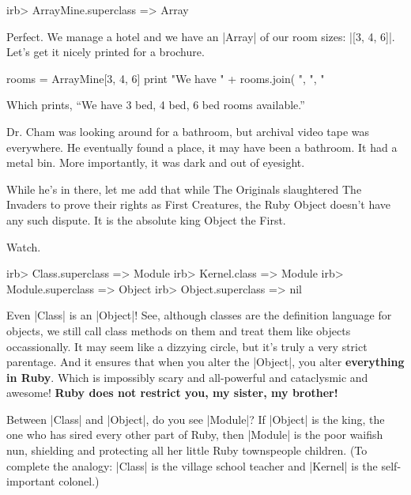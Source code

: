 \documentclass[12pt,twoside]{report}
\begin{document}
\begin{consolecode}

 irb> ArrayMine.superclass
   => Array

\end{consolecode}


Perfect.  We manage a hotel and we have an
\rubyinline|Array| of our room sizes:
\rubyinline|[3, 4, 6]|. Let's get it nicely printed
for a brochure.


\begin{rubycode}

 rooms = ArrayMine[3, 4, 6]
 print "We have " + rooms.join( ", ", "%

\end{rubycode}


Which prints, ``We have 3 bed, 4 bed, 6 bed rooms available.''

Dr. Cham was looking around for a bathroom, but archival video tape
was everywhere. He eventually found a place, it may have been a
bathroom.  It had a metal bin. More importantly, it was dark and out
of eyesight.

While he's in there, let me add that while The Originals slaughtered
The Invaders to prove their rights as First Creatures, the Ruby Object
doesn't have any such dispute.  It is the absolute king Object the
First.

Watch.


\begin{consolecode}

 irb> Class.superclass
   => Module
 irb> Kernel.class
   => Module
 irb> Module.superclass
   => Object
 irb> Object.superclass
   => nil

\end{consolecode}


Even \rubyinline|Class| is an
\rubyinline|Object|!  See, although classes are the
definition language for objects, we still call class methods on them
and treat them like objects occassionally.  It may seem like a
dizzying circle, but it's truly a very strict parentage.  And it
ensures that when you alter the \rubyinline|Object|,
you alter {\bf everything in Ruby}.  Which is impossibly scary and
all-powerful and cataclysmic and awesome!  {\bf Ruby does not restrict
  you, my sister, my brother!}

Between \rubyinline|Class| and
\rubyinline|Object|, do you see
\rubyinline|Module|?  If
\rubyinline|Object| is the king, the one who has sired
every other part of Ruby, then \rubyinline|Module| is
the poor waifish nun, shielding and protecting all her little Ruby
townspeople children.  (To complete the analogy:
\rubyinline|Class| is the village school teacher and
\rubyinline|Kernel| is the self-important colonel.)
\end{document}
